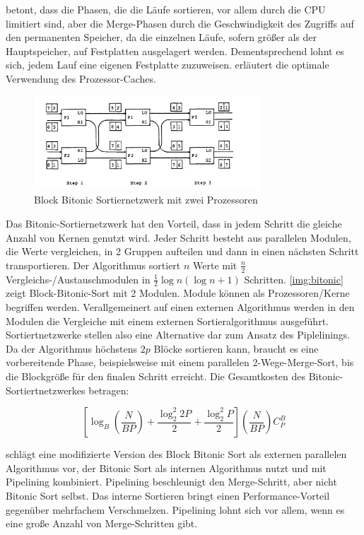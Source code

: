 \documentclass[a4paper,12pt,twoside]{article}
\begin{document}
{\textcite{Salzberg1990}} betont, dass die Phasen, die die Läufe sortieren, vor allem durch die CPU limitiert sind, aber die Merge-Phasen durch die Geschwindigkeit des Zugriffs auf den permanenten Speicher, da die einzelnen Läufe, sofern größer als der Hauptspeicher, auf Festplatten ausgelagert werden. Dementsprechend lohnt es sich, jedem Lauf eine eigenen Festplatte zuzuweisen. {\textcite{Hao2009}} erläutert die optimale Verwendung des Prozessor-Caches.

\begin{figure}
	\centering
	\includegraphics[width=0.75\textwidth]{Bilder/bitonic_block.png}
	\caption{Block Bitonic Sortiernetzwerk mit zwei Prozessoren \autocite[S. 335]{Bitton1983}}
	\label{img:bitonic}
\end{figure}

Das Bitonic-Sortiernetzwerk {\autocite[S. 335f]{Bitton1983}} hat den Vorteil, dass in jedem Schritt die gleiche Anzahl von Kernen genutzt wird. Jeder Schritt besteht aus parallelen Modulen, die Werte vergleichen, in 2 Gruppen aufteilen und dann in einen nächsten Schritt transportieren. Der Algorithmus sortiert $n$ Werte mit $\frac {n} {2} $ Vergleichs-/Austauschmodulen in $\frac{1}{2} \log n (\log n +1)$ Schritten. \autoref{img:bitonic} zeigt Block-Bitonic-Sort mit 2 Modulen. Module können als Prozessoren/Kerne begriffen werden. Verallgemeinert auf einen externen Algorithmus werden in den Modulen die Vergleiche mit einem externen Sortieralgorithmus ausgeführt. Sortiertnetzwerke stellen also eine Alternative dar zum Ansatz des Piplelinings. Da der Algorithmus höchstens $2p$ Blöcke sortieren kann, braucht es eine vorbereitende Phase, beispielsweise mit einem parallelen 2-Wege-Merge-Sort, bis die Blockgröße für den finalen Schritt erreicht. Die Gesamtkosten des Bitonic-Sortiertnetzwerkes betragen:

\[ \left[ \log _B (\frac {N} {B P}) + \frac {\log _2 ^2 2 P} {2} + \frac {\log _2 ^2 P} {2} \right] ( \frac {N}{B P}) C _{P} ^{B} \]

{\textcite{Menon1986}} schlägt eine modifizierte Version des Block Bitonic Sort als externen parallelen Algorithmus vor, der Bitonic Sort als internen Algorithmus nutzt und mit Pipelining kombiniert. Pipelining beschleunigt den Merge-Schritt, aber nicht Bitonic Sort selbst. Das interne Sortieren bringt einen Performance-Vorteil gegenüber mehrfachem Verschmelzen. Pipelining lohnt sich vor allem, wenn es eine große Anzahl von Merge-Schritten gibt.
\end{document}
